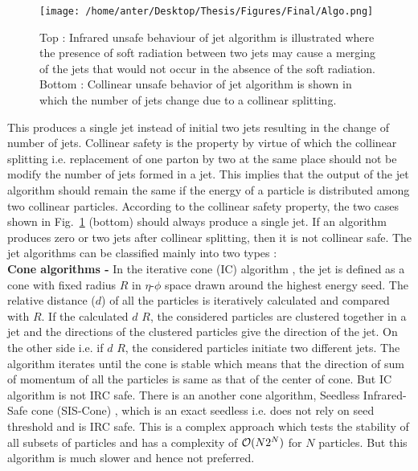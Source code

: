 \begin{figure}[h!]
\begin{center} 
\texttt{[image: /home/anter/Desktop/Thesis/Figures/Final/Algo.png]}\\
\caption[Illustration of infrared and collinear unsafe behaviour of jet algorithms.]{Top : Infrared unsafe behaviour of jet algorithm is illustrated where the presence of soft radiation between two jets may cause a merging of the jets that would not occur in the absence of the soft radiation. Bottom : Collinear unsafe behavior of jet algorithm is shown in which the number of jets change due to a collinear splitting\footnotemark.}
\label{fig:IRC}
\end{center}
\end{figure} This produces a single jet instead of initial two jets resulting in the change of number of jets. Collinear safety is the property by virtue of which the collinear splitting i.e. replacement of one parton by two at the same place should not be modify the number of jets formed in a jet. This implies that the output of the jet algorithm should remain the same if the energy of a particle is distributed among two collinear particles. According to the collinear safety property, the two cases shown in Fig.~\ref{fig:IRC} (bottom) should always produce a single jet. If an algorithm produces zero or two jets after collinear splitting, then it is not collinear safe. The jet algorithms can be classified mainly into two types : \\ \newline
{\bf Cone algorithms -} In the iterative cone (IC) algorithm \cite{Blazey:2000qt}, the jet is defined as a cone with fixed radius $R$ in $\eta$-$\phi$ space drawn around the highest energy seed. The relative distance ($d$) of all the particles is iteratively calculated and compared with $R$. If the calculated $d$ \ls $R$, the considered particles are clustered together in a jet and the directions of the clustered particles give the direction of the jet. On the other side i.e. if $d$ \gr $R$, the considered particles initiate two different jets. The algorithm iterates until the cone is stable which means that the direction of sum of momentum of all the particles is same as that of the center of cone. But IC algorithm is not IRC safe. There is an another cone algorithm, Seedless Infrared-Safe cone (SIS-Cone) \cite{Weinzierl:2011jx}, which is an exact seedless i.e. does not rely on seed threshold and is IRC safe. This is a complex approach which tests the stability of all subsets of particles and has a complexity of ${\cal O}(N2^{N})$ for $N$ particles. But this algorithm is much slower and hence not preferred. \\ \newline
